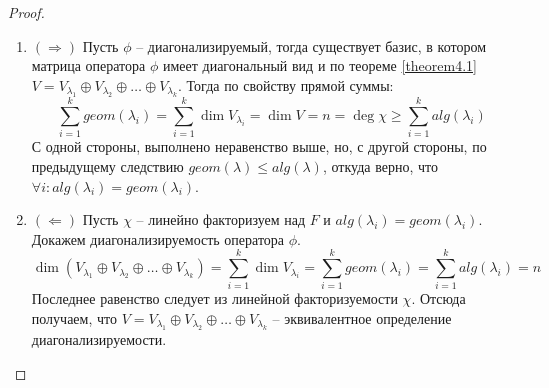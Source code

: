 \begin{proof}~
    \begin{enumerate}
        \item $(\Rightarrow)$ Пусть $\phi$ -- диагонализируемый, тогда существует базис, в котором матрица оператора $\phi$ 
        имеет диагональный вид и по теореме \ref{theorem4.1} 
        $V = V_{\lambda_1} \oplus V_{\lambda_2} \oplus \dots \oplus V_{\lambda_k}$. 
        Тогда по свойству прямой суммы: 
        $$\sum_{i=1}^k geom(\lambda_i) = \sum_{i=1}^k \dim V_{\lambda_i} = 
        \dim V = n = \deg \chi \geq \sum_{i=1}^k alg(\lambda_i)$$
        С одной стороны, выполнено неравенство выше, но, с другой стороны, по предыдущему следствию 
        $geom(\lambda) \leq alg(\lambda)$, откуда верно, что $\forall i: alg(\lambda_i) = geom(\lambda_i)$.
        \item $(\Leftarrow)$ Пусть $\chi$ -- линейно факторизуем над $F$ и $alg(\lambda_i) = geom(\lambda_i)$. 
        Докажем диагонализируемость оператора $\phi$.
        $$\dim(V_{\lambda_1} \oplus V_{\lambda_2} \oplus \dots \oplus V_{\lambda_k}) = 
        \sum_{i=1}^k \dim V_{\lambda_i} = \sum_{i=1}^k geom(\lambda_i) = \sum_{i=1}^k alg(\lambda_i) = n$$
        Последнее равенство следует из линейной факторизуемости $\chi$. 
        Отсюда получаем, что $V = V_{\lambda_1} \oplus V_{\lambda_2} \oplus \dots \oplus V_{\lambda_k}$ -- 
        эквивалентное определение диагонализируемости.
    \end{enumerate}
\end{proof}
